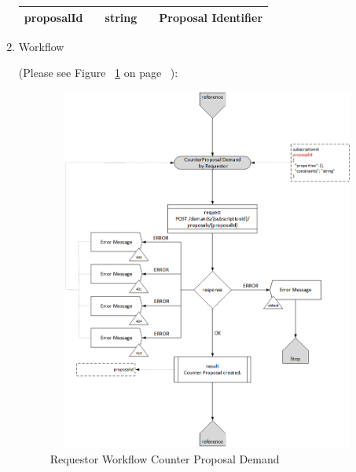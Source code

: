 \begin{enumerate}
\begin{center}
\begin{tabular}{|p{3cm}|l|p{3cm}|p{3cm}|p{4cm}|}
proposalId	&	&	string				&								& Proposal Identifier \\

\hline

\end{tabular}
\end{center}


\item Workflow

(Please see Figure ~\ref{fig:CPD} on page ~\pageref{fig:CPD}):

\begin{figure}[htbp]
    \centering
    \includegraphics[width=12cm,height=12cm,angle=0]{./diag/Workflow/Market/CounterProposalDemand-R-Workflow.png}
    \caption{Requestor Workflow Counter Proposal Demand }
	\label{fig:CPD}
\end{figure}


\end{enumerate}

\newpage


